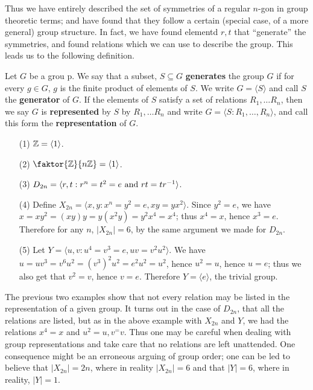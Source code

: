Thus we have entirely described the set of symmetries of a regular $n$-gon in
group theoretic terms; and have found that they follow a certain  (special case,
of a more general) group structure. In fact, we have found elementd $r,t$ that
``generate'' the symmetries, and found relations which we can use to describe
the group. This leads us to the following definition.

\begin{definition}
  Let $G$ be a grou p. We say that a subset, $S \subseteq G$
  \textbf{generates} the group $G$ if for every  $g \in G$,  $g$ is the finite
  product of elements of  $S$. We write  $G=\langle S \rangle$ and call $S$ the
  \textbf{generator} of $G$. If the elements of  $S$ satisfy a set of
  relations  $R_1, \dots R_n$, then we say $G$ is  \textbf{represented} by $S$
  by $R_1, \dots R_n$ and write $G=\langle S : R_1, \dots, R_n \rangle$, and call
  this form the \textbf{representation} of $G$.
\end{definition}

\begin{example}
  \begin{enumerate}
    \item[(1)] $\mathbb{Z}= \langle 1 \rangle$.

    \item[(2)] $\faktor{\Z}{n\Z}=\langle 1 \rangle$.

    \item[(3)] $D_{2n}= \langle r,t : r^n=t^2=e \text{ and }
      rt=tr^{-1} \rangle$.

    \item[(4)] Define $X_{2n}=\langle x,y : x^n=y^2=e, xy=yx^2 \rangle$. Since
      $y^2=e$, we have  $x=xy^2=(xy)y=y(x^2y)=y^2x^4=x^4$; thus $x^4=x$,
      hence  $x^3=e$. Therefore  for any $n$, $|X_{2n}|=6$, by the
      same argument we made for $D_{2n}$.

    \item[(5)] Let $Y=\langle u,v : u^4=v^3=e, uv=v^2u^2 \rangle$. We have
      $u=uv^3=v^6u^2=(v^3)^2u^2=e^2u^2=u^2$, hence $u^2=u$, hence  $u=e$;
      thus we also get that  $v^2=v$, hence  $v=e$. Therefore
      $Y=\langle e \rangle$, the trivial group.
  \end{enumerate}
\end{example}

The previous two examples show that not every relation may be listed in the
representation of a given group. It turns out in the case of $D_{2n}$, that all
the relations are listed, but as in the above example with $X_{2n}$ and $Y$, we
had the relations $x^4=x$ and  $u^2=u, v^=v$. Thus one may be careful when
dealing with group representations and take care that no relations are left
unattended. One consequence might be an erroneous arguing of group order; one
can be led to believe that $|X_{2n}|=2n$, where in reality $|X_{2n}|=6$
and that $|Y|=6$, where in reality, $|Y|=1$.
